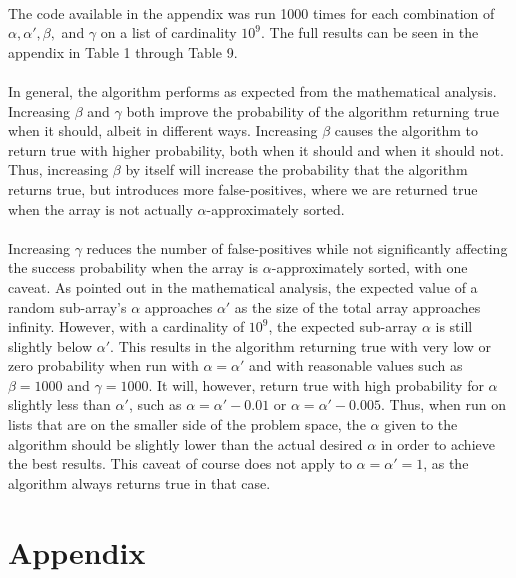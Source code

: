 \documentclass{article}
\begin{document}
\paragraph{}The code available in the appendix was run 1000 times for each combination of $\alpha, \alpha', \beta,$ and $\gamma$ on a list of cardinality $10^9$.
 The full results can be seen in the appendix in Table 1 through Table 9.
\paragraph{}In general, the algorithm performs as expected from the mathematical analysis. 
Increasing $\beta$ and $\gamma$ both improve the probability of the algorithm returning true when it should, albeit in different ways.
Increasing $\beta$ causes the algorithm to return true with higher probability, both when it should and when it should not.
Thus, increasing $\beta$ by itself will increase the probability that the algorithm returns true, but introduces more false-positives, where we are returned true when the array is not actually $\alpha$-approximately sorted.
\paragraph{}Increasing $\gamma$ reduces the number of false-positives while not significantly affecting the success probability when the array is $\alpha$-approximately sorted, with one caveat.
As pointed out in the mathematical analysis, the expected value of a random sub-array's $\alpha$ approaches $\alpha'$ as the size of the total array approaches infinity.
However, with a cardinality of $10^9$, the expected sub-array $\alpha$ is still slightly below $\alpha'$. 
This results in the algorithm returning true with very low or zero probability when run with $\alpha = \alpha'$ and with reasonable values such as $\beta = 1000$ and $\gamma = 1000$.
It will, however, return true with high probability for $\alpha$ slightly less than $\alpha'$, such as $\alpha = \alpha' - 0.01$ or $\alpha = \alpha' - 0.005$.
Thus, when run on lists that are on the smaller side of the problem space, the $\alpha$ given to the algorithm should be slightly lower than the actual desired $\alpha$ in order to achieve the best results.
This caveat of course does not apply to $\alpha = \alpha' = 1$, as the algorithm always returns true in that case.
\section{Appendix}
\end{document}
